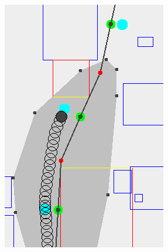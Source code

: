 \begin{figure}
	\centering
	\begin{subfigure}[t]{0.30\columnwidth}
        		\includegraphics[width=\textwidth]{img/transition-suboptimal-pre}
        		\caption{}
        		 \label{fig:transition-suboptimal-pre}
	\end{subfigure}	
	\hfill
	\begin{subfigure}[t]{0.30\columnwidth}

\end{subfigure}
\end{figure}
